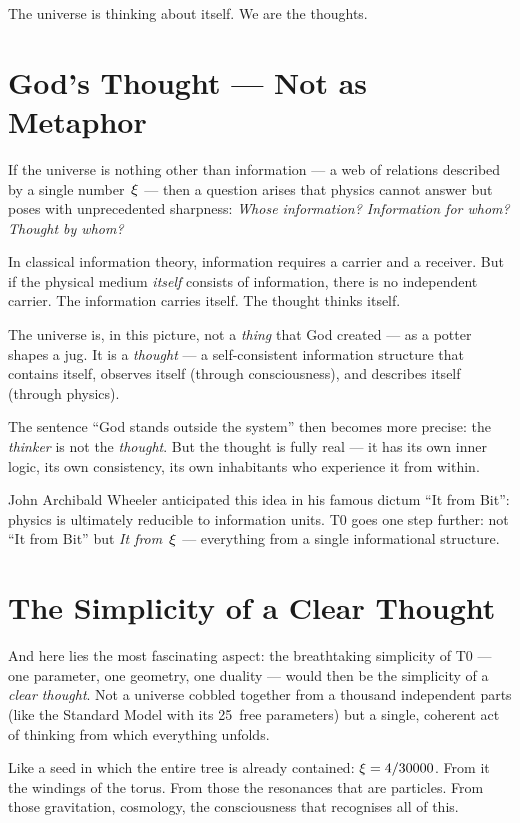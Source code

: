 The universe is thinking about itself. We are the thoughts.

\section{God's Thought --- Not as Metaphor}

If the universe is nothing other than information --- a web of relations described by a single number~$\xi$ --- then a question arises that physics cannot answer but poses with unprecedented sharpness: \emph{Whose information? Information for whom? Thought by whom?}

In classical information theory, information requires a carrier and a receiver. But if the physical medium \emph{itself} consists of information, there is no independent carrier. The information carries itself. The thought thinks itself.

The universe is, in this picture, not a \emph{thing} that God created --- as a potter shapes a jug. It is a \emph{thought} --- a self-consistent information structure that contains itself, observes itself (through consciousness), and describes itself (through physics).

The sentence ``God stands outside the system'' then becomes more precise: the \emph{thinker} is not the \emph{thought}. But the thought is fully real --- it has its own inner logic, its own consistency, its own inhabitants who experience it from within.

John Archibald Wheeler anticipated this idea in his famous dictum ``It from Bit'': physics is ultimately reducible to information units. T0 goes one step further: not ``It from Bit'' but \emph{It from~$\xi$} --- everything from a single informational structure.

\section{The Simplicity of a Clear Thought}

And here lies the most fascinating aspect: the breathtaking simplicity of T0 --- one parameter, one geometry, one duality --- would then be the simplicity of a \emph{clear thought}. Not a universe cobbled together from a thousand independent parts (like the Standard Model with its 25~free parameters) but a single, coherent act of thinking from which everything unfolds.

Like a seed in which the entire tree is already contained: $\xi = 4/30000$. From it the windings of the torus. From those the resonances that are particles. From those gravitation, cosmology, the consciousness that recognises all of this.

